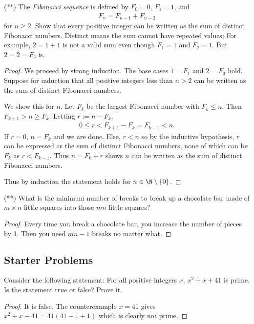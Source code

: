 \documentclass[12pt]{article}
\begin{document}
\begin{problem}
\label{Fibonacci-sum}
(**) The \emph{Fibonacci sequence} is defined by $F_0 = 0$, $F_1 = 1$, and
\begin{align*}
    F_n = F_{n-1} + F_{n-2}
\end{align*}
for $n \geq 2$. Show that every positive integer can be written as the sum of distinct Fibonacci numbers. Distinct means the sum cannot have repeated values; For example, $2 = 1 + 1$ is not a valid sum even though $F_1 = 1$ and $F_2 = 1$. But $2 = 2 = F_3$ is.

\begin{proof}
We proceed by strong induction. The base cases $1 = F_1$ and $2 = F_3$ hold. Suppose for induction that all positive integers less than $n > 2$ can be written as the sum of distinct Fibonacci numbers. \medskip 

We show this for $n$. Let $F_k$ be the largest Fibonacci number with $F_k \leq n$. Then $F_{k+1} > n \geq F_k$. Letting $r := n - F_k$,
\begin{align*}
    0 \leq r < F_{k + 1} - F_k = F_{k-1} < n.
\end{align*}
If $r = 0$, $n = F_k$ and we are done. Else, $r < n$ so by the inductive hypothesis, $r$ can be expressed as the sum of distinct Fibonacci numbers, none of which can be $F_k$ as $r < F_{k-1}$. Thus $n = F_k + r$ shows $n$ can be written as the sum of distinct Fibonacci numbers. \medskip

Thus by induction the statement holds for $n \in \N \setminus \{0\}$.
\end{proof}
\end{problem}

\begin{problem}
(**) What is the minimum number of breaks to break up a chocolate bar made of $m \times n$ little squares into those $mn$ little squares?

\begin{proof}
Every time you break a chocolate bar, you increase the number of pieces by 1. Then you need $mn -1$ breaks no matter what.
\end{proof}
\end{problem}

\subsection*{Starter Problems}

\begin{problem}
Consider the following statement: For all positive integers $x$, $x^2 + x + 41$ is prime. Is the statement true or false? Prove it.

\begin{proof}
It is false. The counterexample $x = 41$ gives $x^2 + x + 41 = 41(41 + 1 + 1)$ which is clearly not prime.
\end{proof}
\end{problem}
\end{document}
